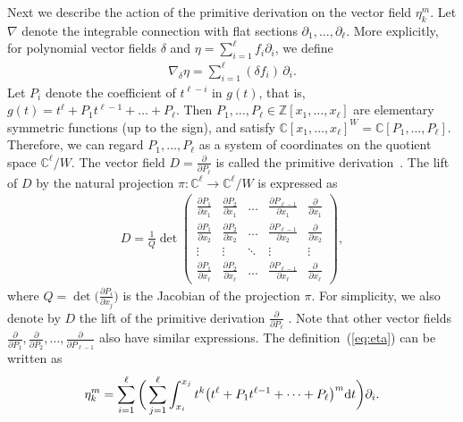 \documentclass[pdftex]{sigma}
\numberwithin{equation}{section}
\newcommand{\Z}{\mathbb{Z}}
\newcommand{\C}{\mathbb{C}}
\begin{document}
Next we describe the action of the primitive derivation on the vector field $\eta_k^m$.
Let $\nabla$ denote the integrable connection with flat sections
$\partial_1, \dots, \partial_\ell$. More explicitly, for polynomial
vector fields $\delta$ and $\eta=\sum_{i=1}^\ell f_i\partial_i$, we define
\begin{gather*}
\nabla_\delta\eta=\sum_{i=1}^\ell (\delta f_i)\,\partial_i.
\end{gather*}
Let $P_i$ denote the coefficient of $t^{\ell-i}$ in $g(t)$, that is,
$g(t)=t^\ell+P_1t^{\ell-1}+\dots+P_\ell$. Then $P_1, \dots, P_\ell
\in\Z[x_1, \dots, x_\ell]$ are elementary symmetric functions (up to the sign),
and satisfy $\C[x_1, \dots, x_\ell]^W=\C[P_1, \dots, P_\ell]$. Therefore,
we can regard $P_1, \dots, P_\ell$ as a system of coordinates on the
quotient space $\C^\ell/W$. The vector field $D=\frac{\partial}{\partial P_\ell}$
is called the primitive derivation~\cite{sai-lin, sai-unif}. The lift of $D$ by
the natural projection $\pi\colon \C^\ell\longrightarrow\C^\ell/W$ is
expressed as
\begin{gather*}
D=
\frac{1}{Q}\det
\begin{pmatrix}
\frac{\partial P_1}{\partial x_1}&
\frac{\partial P_2}{\partial x_1}&
\dots &
\frac{\partial P_{\ell-1}}{\partial x_1}&
\frac{\partial}{\partial x_1}
\\[1ex]
\frac{\partial P_1}{\partial x_2}&
\frac{\partial P_2}{\partial x_2}&
\dots &
\frac{\partial P_{\ell-1}}{\partial x_2}&
\frac{\partial}{\partial x_2}
\\
\vdots&\vdots&\ddots&\vdots&\vdots
\\
\frac{\partial P_1}{\partial x_\ell}&
\frac{\partial P_2}{\partial x_\ell}&
\dots &
\frac{\partial P_{\ell-1}}{\partial x_\ell}&
\frac{\partial}{\partial x_\ell}
\end{pmatrix}\!,
\end{gather*}
where $Q=\det\big(\frac{\partial P_i}{\partial x_j}\big)$ is the Jacobian of the projection
$\pi$. For simplicity, we also denote by $D$ the lift of the primitive derivation
$\frac{\partial}{\partial P_\ell}$ . Note that other vector fields
$\frac{\partial}{\partial P_1}, \frac{\partial}{\partial P_2}, \dots,
\frac{\partial}{\partial P_{\ell-1}}$ also have similar expressions.
The definition~(\ref{eq:eta}) can be written as
\begin{gather*}
\eta_k^m=\sum_{i=1}^\ell\bigg(\sum_{j=1}^\ell
\int_{x_i}^{x_j}t^k\big(t^\ell+P_1t^{\ell-1}+\dots +P_\ell\big)^m {\rm d}t\bigg)\partial_i.
\end{gather*}
\end{document}
